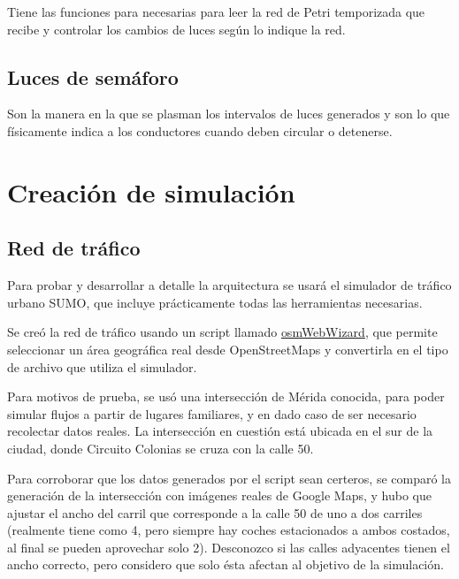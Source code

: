 Tiene las funciones para necesarias para leer la red de Petri
temporizada que recibe y controlar los cambios de luces según lo indique
la red.

\hypertarget{luces-de-semuxe1foro}{%
\subsection{Luces de semáforo}\label{luces-de-semuxe1foro}}

Son la manera en la que se plasman los intervalos de luces generados y
son lo que físicamente indica a los conductores cuando deben circular o
detenerse.

\hypertarget{creaciuxf3n-de-simulaciuxf3n}{%
\section{Creación de simulación}\label{creaciuxf3n-de-simulaciuxf3n}}

\hypertarget{red-de-truxe1fico}{%
\subsection{Red de tráfico}\label{red-de-truxe1fico}}

Para probar y desarrollar a detalle la arquitectura se usará el
simulador de tráfico urbano SUMO, que incluye prácticamente todas las
herramientas necesarias.

Se creó la red de tráfico usando un script llamado
\href{https://sumo.dlr.de/docs/Tutorials/OSMWebWizard.html}{osmWebWizard},
que permite seleccionar un área geográfica real desde OpenStreetMaps y
convertirla en el tipo de archivo que utiliza el simulador.

Para motivos de prueba, se usó una intersección de Mérida conocida, para
poder simular flujos a partir de lugares familiares, y en dado caso de
ser necesario recolectar datos reales. La intersección en cuestión está
ubicada en el sur de la ciudad, donde Circuito Colonias se cruza con la
calle 50.

Para corroborar que los datos generados por el script sean certeros, se
comparó la generación de la intersección con imágenes reales de Google
Maps, y hubo que ajustar el ancho del carril que corresponde a la calle
50 de uno a dos carriles (realmente tiene como 4, pero siempre hay
coches estacionados a ambos costados, al final se pueden aprovechar solo
2). Desconozco si las calles adyacentes tienen el ancho correcto, pero
considero que solo ésta afectan al objetivo de la simulación.

